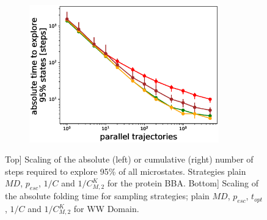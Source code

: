 \begin{figure}[H]
\begin{subfigure}[t]{0.5\textwidth}
  \end{subfigure}
  \begin{subfigure}[t]{0.5\textwidth}
    \includegraphics[width=0.9\textwidth]{figures/1FME_6_steps10000_scaling_explore.eps}   
  \end{subfigure}

  \caption{Top] Scaling of the
  absolute (left) or cumulative (right) number of steps required to explore
  95\% of all microstates. Strategies plain $MD$, $p_{esc}$, $1/C$ and $1/C_{M,2}^K$ for the protein BBA. 
  Bottom] Scaling of the absolute folding time for sampling strategies; plain
  $MD$, $p_{esc}$, $t_{opt}$, $1/C$ and $1/C_{M,2}^K$ for WW Domain.
  }
  \label{fig:scaling}
\end{figure}

